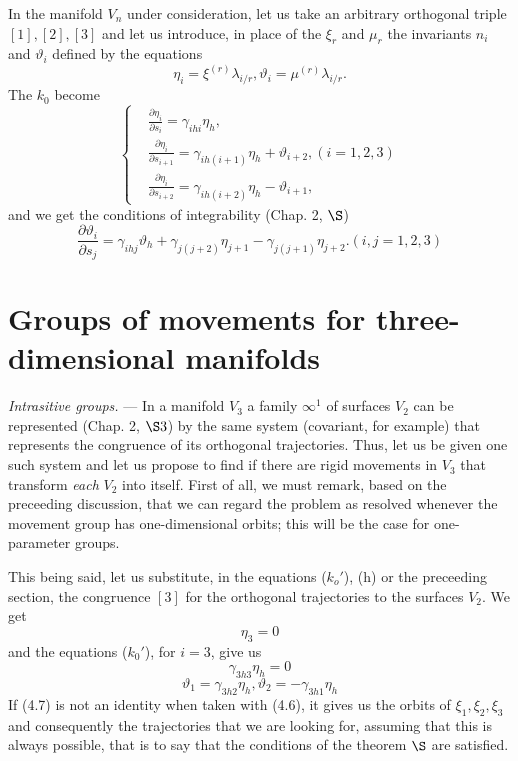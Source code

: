 \documentclass{book}
\begin{document}
In the manifold $V_n$ under consideration, let us take an arbitrary orthogonal triple $[1],[2],[3]$ and let us introduce, in place of the $\xi_r$ and $\mu_r$ the invariants $n_i$ and $\vartheta_i$ defined by the equations
$$\eta_i=\xi^{(r)}\lambda_{i/r}, \vartheta_i=\mu^{(r)}\lambda_{i/r}.$$
The $k_0$ become
\begin{equation*}
\begin{cases}
&\displaystyle\frac{\partial\eta_i}{\partial s_i}=\gamma_{ihi}\eta_h,\\
&\displaystyle\frac{\partial\eta_i}{\partial s_{i+1}}=\gamma_{ih(i+1)}\eta_h+\vartheta_{i+2}, (i=1,2,3)\\
&\displaystyle\frac{\partial\eta_i}{\partial s_{i+2}}=\gamma_{ih(i+2)}\eta_h-\vartheta_{i+1},
\end{cases}
\tag{$k_0'$}
\end{equation*}
and we get the conditions of integrability (Chap. 2, $\S$)
\begin{equation*}
\frac{\partial\vartheta_i}{\partial s_j}=\gamma_{ihj}\vartheta_h+\gamma_{j(j+2)}\eta_{j+1}-\gamma_{j(j+1)}\eta_{j+2}. (i,j=1,2,3)
\tag{h}
\end{equation*}

\section{Groups of movements for three-dimensional manifolds}
\emph{Intrasitive groups.} --- In a manifold $V_3$ a family $\infty^1$ of surfaces $V_2$ can be represented (Chap. 2, $\S3$) by the same system (covariant, for example) that represents the congruence of its orthogonal trajectories. Thus, let us be given one such system and let us propose to find if there are rigid movements in $V_3$ that transform \emph{each} $V_2$ into itself. First of all, we must remark, based on the preceeding discussion, that we can regard the problem as resolved whenever the movement group has one-dimensional orbits; this will be the case for one-parameter groups. 

This being said, let us substitute, in the equations ($k_o'$), (h) or the preceeding section, the congruence $[3]$ for the orthogonal trajectories to the surfaces $V_2$. We get
\begin{equation}
\eta_3=0
\end{equation} 
and the equations ($k_0'$), for $i=3$, give us
\begin{equation}
\gamma_{3h3}\eta_h=0
\end{equation}
\begin{equation}
\vartheta_1=\gamma_{3h2}\eta_h, \vartheta_2=-\gamma_{3h1}\eta_h
\end{equation}
If (4.7) is not an identity when taken with (4.6), it gives us the orbits of $\xi_1,\xi_2,\xi_3$ and consequently the trajectories that we are looking for, assuming that this is always possible, that is to say that the conditions of the theorem $\S$ are satisfied. 
\end{document}
